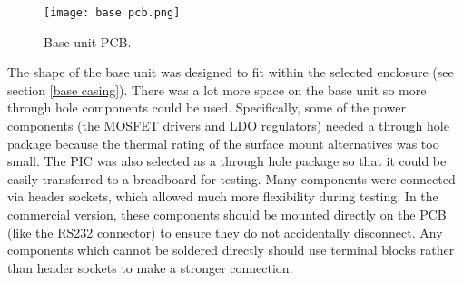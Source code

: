 \begin{figure}[htbp]
	\centering
	\texttt{[image: base pcb.png]}
	\caption{Base unit PCB.}
	\label{fig: base pcb}
\end{figure}

The shape of the base unit was designed to fit within the selected enclosure (see section \ref{base casing}). There was a lot more space on the base unit so more through hole components could be used. Specifically, some of the power components (the MOSFET drivers and LDO regulators) needed a through hole package because the thermal rating of the surface mount alternatives was too small. The PIC was also selected as a through hole package so that it could be easily transferred to a breadboard for testing. Many components were connected via header sockets, which allowed much more flexibility during testing. In the commercial version, these components should be mounted directly on the PCB (like the RS232 connector) to ensure they do not accidentally disconnect. Any components which cannot be soldered directly should use terminal blocks rather than header sockets to make a stronger connection.\\